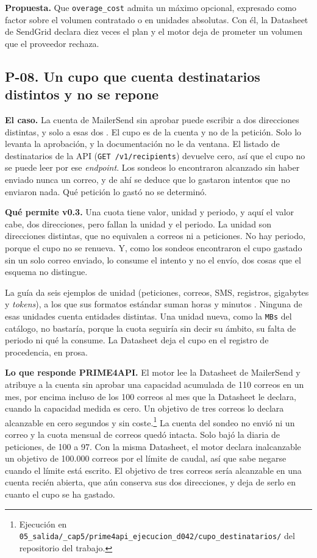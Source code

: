 \textbf{Propuesta.} Que \texttt{overage\_cost} admita un máximo opcional, expresado como factor sobre el volumen contratado o en unidades absolutas.
Con él, la Datasheet de SendGrid declara diez veces el plan y el motor deja de prometer un volumen que el proveedor rechaza.

\subsection{P-08. Un cupo que cuenta destinatarios distintos y no se repone}
\label{subsec:evolucion:p08}

\textbf{El caso.} La cuenta de MailerSend sin aprobar puede escribir a dos direcciones distintas, y solo a esas dos \citep{mailersenddocs}.
El cupo es de la cuenta y no de la petición. Solo lo levanta la aprobación, y la documentación no le da ventana.
El listado de destinatarios de la API (\texttt{GET /v1/recipients}) devuelve cero, así que el cupo no se puede leer por ese \textit{endpoint}.
Los sondeos lo encontraron alcanzado sin haber enviado nunca un correo, y de ahí se deduce que lo gastaron intentos que no enviaron nada.
Qué petición lo gastó no se determinó.

\textbf{Qué permite v0.3.} Una cuota tiene valor, unidad y periodo, y aquí el valor cabe, dos direcciones, pero fallan la unidad y el periodo.
La unidad son direcciones distintas, que no equivalen a correos ni a peticiones.
No hay periodo, porque el cupo no se renueva.
Y, como los sondeos encontraron el cupo gastado sin un solo correo enviado, lo consume el intento y no el envío, dos cosas que el esquema no distingue.

La guía da seis ejemplos de unidad (peticiones, correos, SMS, registros, gigabytes y \textit{tokens}), a los que sus formatos estándar suman horas y minutos \citep{apisconsumptionmodel}.
Ninguna de esas unidades cuenta entidades distintas.
Una unidad nueva, como la \texttt{MBs} del catálogo, no bastaría, porque la cuota seguiría sin decir su ámbito, su falta de periodo ni qué la consume.
La Datasheet deja el cupo en el registro de procedencia, en prosa.

\textbf{Lo que responde PRIME4API.} El motor lee la Datasheet de MailerSend y atribuye a la cuenta sin aprobar una capacidad acumulada de 110 correos en un mes, por encima incluso de los 100 correos al mes que la Datasheet le declara, cuando la capacidad medida es cero.
Un objetivo de tres correos lo declara alcanzable en cero segundos y sin coste.\footnote{Ejecución en \texttt{05\_salida/\_cap5/prime4api\_ejecucion\_d042/cupo\_destinatarios/} del repositorio del trabajo.}
La cuenta del sondeo no envió ni un correo y la cuota mensual de correos quedó intacta. Solo bajó la diaria de peticiones, de 100 a 97.
Con la misma Datasheet, el motor declara inalcanzable un objetivo de 100.000 correos por el límite de caudal, así que sabe negarse cuando el límite está escrito.
El objetivo de tres correos sería alcanzable en una cuenta recién abierta, que aún conserva sus dos direcciones, y deja de serlo en cuanto el cupo se ha gastado.

